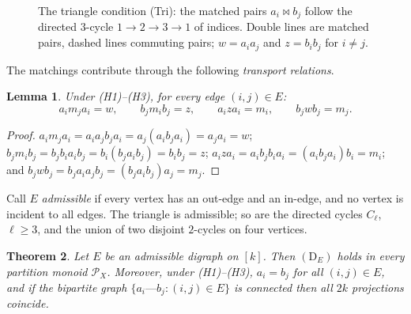 \documentclass[11pt]{amsart}
\newtheorem{theorem}{Theorem}[section]
\newtheorem{lemma}[theorem]{Lemma}
\theoremstyle{definition}
\renewcommand{\P}{\mathcal{P}}      %
\newcommand{\mt}{\bowtie}      %
\newcommand{\Tri}{\textup{(Tri)}}
\begin{document}
\begin{figure}[htbp]
\centering
{}
\caption{The triangle condition \Tri: the matched pairs $a_i\mt b_j$ follow the directed $3$-cycle $1\to2\to3\to1$ of indices. Double lines are matched pairs, dashed lines commuting pairs; $w=a_ia_j$ and $z=b_ib_j$ for $i\ne j$.}\label{fig:tri}
\end{figure}


The matchings contribute through the following \emph{transport relations}.

\begin{lemma}\label{lem:H4}
Under \textup{(H1)}--\textup{(H3)}, for every edge $(i,j)\in E$:
\begin{equation}\label{eq:H4}
a_im_ja_i=w,\qquad b_jm_ib_j=z,\qquad a_iza_i=m_i,\qquad b_jwb_j=m_j .
\end{equation}
\end{lemma}

\begin{proof}
$a_im_ja_i=a_ia_jb_ja_i=a_j(a_ib_ja_i)=a_ja_i=w$; $b_jm_ib_j=b_jb_ia_ib_j=b_i(b_ja_ib_j)=b_ib_j=z$; $a_iza_i=a_ib_jb_ia_i=(a_ib_ja_i)b_i=m_i$; and $b_jwb_j=b_ja_ia_jb_j=(b_ja_ib_j)a_j=m_j$.
\end{proof}

Call $E$ \emph{admissible} if every vertex has an out-edge and an in-edge, and no vertex is incident to all edges. The triangle is admissible; so are the directed cycles $C_\ell$, $\ell\ge3$, and the union of two disjoint $2$-cycles on four vertices.

\begin{theorem}\label{thm:DE}
Let $E$ be an admissible digraph on $[k]$. Then $(\mathrm D_E)$ holds in every partition monoid $\P_X$. Moreover, under \textup{(H1)}--\textup{(H3)}, $a_i=b_j$ for all $(i,j)\in E$, and if the bipartite graph $\{a_i\text{---}b_j:(i,j)\in E\}$ is connected then all $2k$ projections coincide.
\end{theorem}
\end{document}
